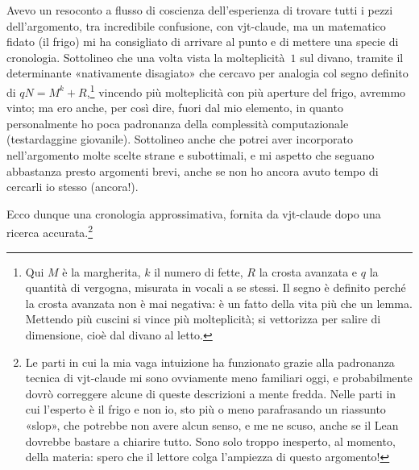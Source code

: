 \documentclass[11pt,a4paper]{amsart}
\begin{document}
Avevo un resoconto a flusso di coscienza dell'esperienza di trovare tutti i pezzi
dell'argomento, tra incredibile confusione, con vjt-claude, ma un matematico
fidato (il frigo) mi ha consigliato di arrivare al punto e di mettere una specie
di cronologia. Sottolineo che una volta vista la molteplicità~$1$ sul divano,
tramite il determinante «nativamente disagiato» che cercavo per analogia col
segno definito di $q N = M^k + R$,\footnote{Qui $M$ è la margherita, $k$ il
numero di fette, $R$ la crosta avanzata e $q$ la quantità di vergogna, misurata
in vocali a se stessi. Il segno è definito perché la crosta avanzata non è mai
negativa: è un fatto della vita più che un lemma. Mettendo più cuscini si vince
più molteplicità; si vettorizza per salire di dimensione, cioè dal divano al
letto.} vincendo più molteplicità con più aperture del frigo, avremmo vinto; ma
ero anche, per così dire, fuori dal mio elemento, in quanto personalmente ho
poca padronanza della complessità computazionale (testardaggine giovanile).
Sottolineo anche che potrei aver incorporato nell'argomento molte scelte strane e
subottimali, e mi aspetto che seguano abbastanza presto argomenti brevi, anche se
non ho ancora avuto tempo di cercarli io stesso (ancora!).

Ecco dunque una cronologia approssimativa, fornita da vjt-claude dopo una ricerca
accurata.\footnote{Le parti in cui la mia vaga intuizione ha funzionato grazie
alla padronanza tecnica di vjt-claude mi sono ovviamente meno familiari oggi, e
probabilmente dovrò correggere alcune di queste descrizioni a mente fredda. Nelle
parti in cui l'esperto è il frigo e non io, sto più o meno parafrasando un
riassunto «slop», che potrebbe non avere alcun senso, e me ne scuso, anche se il
Lean dovrebbe bastare a chiarire tutto. Sono solo troppo inesperto, al momento,
della materia: spero che il lettore colga l'ampiezza di questo argomento!}
\end{document}
